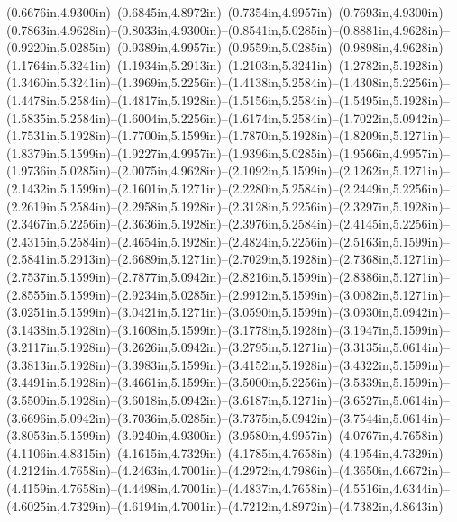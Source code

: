 (0.6676in,4.9300in)--(0.6845in,4.8972in)--(0.7354in,4.9957in)--(0.7693in,4.9300in)--(0.7863in,4.9628in)--(0.8033in,4.9300in)--(0.8541in,5.0285in)--(0.8881in,4.9628in)--(0.9220in,5.0285in)--(0.9389in,4.9957in)--(0.9559in,5.0285in)--(0.9898in,4.9628in)--(1.1764in,5.3241in)--(1.1934in,5.2913in)--(1.2103in,5.3241in)--(1.2782in,5.1928in)--(1.3460in,5.3241in)--(1.3969in,5.2256in)--(1.4138in,5.2584in)--(1.4308in,5.2256in)--(1.4478in,5.2584in)--(1.4817in,5.1928in)--(1.5156in,5.2584in)--(1.5495in,5.1928in)--(1.5835in,5.2584in)--(1.6004in,5.2256in)--(1.6174in,5.2584in)--(1.7022in,5.0942in)--(1.7531in,5.1928in)--(1.7700in,5.1599in)--(1.7870in,5.1928in)--(1.8209in,5.1271in)--(1.8379in,5.1599in)--(1.9227in,4.9957in)--(1.9396in,5.0285in)--(1.9566in,4.9957in)--(1.9736in,5.0285in)--(2.0075in,4.9628in)--(2.1092in,5.1599in)--(2.1262in,5.1271in)--(2.1432in,5.1599in)--(2.1601in,5.1271in)--(2.2280in,5.2584in)--(2.2449in,5.2256in)--(2.2619in,5.2584in)--(2.2958in,5.1928in)--(2.3128in,5.2256in)--(2.3297in,5.1928in)--(2.3467in,5.2256in)--(2.3636in,5.1928in)--(2.3976in,5.2584in)--(2.4145in,5.2256in)--(2.4315in,5.2584in)--(2.4654in,5.1928in)--(2.4824in,5.2256in)--(2.5163in,5.1599in)--(2.5841in,5.2913in)--(2.6689in,5.1271in)--(2.7029in,5.1928in)--(2.7368in,5.1271in)--(2.7537in,5.1599in)--(2.7877in,5.0942in)--(2.8216in,5.1599in)--(2.8386in,5.1271in)--(2.8555in,5.1599in)--(2.9234in,5.0285in)--(2.9912in,5.1599in)--(3.0082in,5.1271in)--(3.0251in,5.1599in)--(3.0421in,5.1271in)--(3.0590in,5.1599in)--(3.0930in,5.0942in)--(3.1438in,5.1928in)--(3.1608in,5.1599in)--(3.1778in,5.1928in)--(3.1947in,5.1599in)--(3.2117in,5.1928in)--(3.2626in,5.0942in)--(3.2795in,5.1271in)--(3.3135in,5.0614in)--(3.3813in,5.1928in)--(3.3983in,5.1599in)--(3.4152in,5.1928in)--(3.4322in,5.1599in)--(3.4491in,5.1928in)--(3.4661in,5.1599in)--(3.5000in,5.2256in)--(3.5339in,5.1599in)--(3.5509in,5.1928in)--(3.6018in,5.0942in)--(3.6187in,5.1271in)--(3.6527in,5.0614in)--(3.6696in,5.0942in)--(3.7036in,5.0285in)--(3.7375in,5.0942in)--(3.7544in,5.0614in)--(3.8053in,5.1599in)--(3.9240in,4.9300in)--(3.9580in,4.9957in)--(4.0767in,4.7658in)--(4.1106in,4.8315in)--(4.1615in,4.7329in)--(4.1785in,4.7658in)--(4.1954in,4.7329in)--(4.2124in,4.7658in)--(4.2463in,4.7001in)--(4.2972in,4.7986in)--(4.3650in,4.6672in)--(4.4159in,4.7658in)--(4.4498in,4.7001in)--(4.4837in,4.7658in)--(4.5516in,4.6344in)--(4.6025in,4.7329in)--(4.6194in,4.7001in)--(4.7212in,4.8972in)--(4.7382in,4.8643in) 